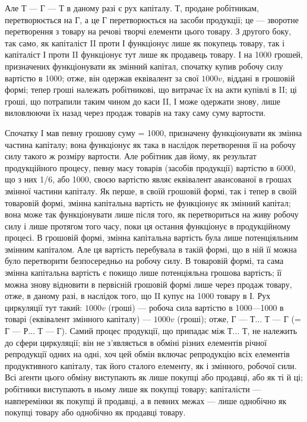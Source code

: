 Але Т — Г — Т в даному разі є рух капіталу. Т, продане робітникам,
перетворюється на Г, а це Г перетворюється на засоби продукції; це —
зворотне перетворення з товару на речові творчі елементи цього товару.
З другого боку, так само, як капіталіст II проти І функціонує лише як покупець
товару, так і капіталіст І проти II функціонує тут лише як продавець товару. І на 1000
грошей, призначених функціонувати як змінний капітал, спочатку купив робочу силу вартістю в 1000;
отже, він одержав еквівалент за свої $1000 v$, віддані в грошовій формі; тепер гроші належать
робітникові, що витрачає їх на акти купівлі в II; ці гроші, що потрапили таким чином до каси II, І
може одержати знову, лише виловлюючи їх назад через продаж товарів на таку саму суму вартости.

Спочатку І мав певну грошову суму = 1000, призначену функціонувати
як змінна частина капіталу; вона функціонує як така в наслідок перетворення її на робочу силу такого
ж розміру вартости. Але робітник дав йому, як результат продукційного процесу, певну масу товарів
(засобів продукції) вартістю в 6000, що з них 1/6, або 1000, своєю вартістю
являє еквівалент авансованої в грошах змінної частини капіталу. Як перше,
в своїй грошовій формі, так і тепер в своїй товаровій формі, змінна
капітальна вартість не функціонує як змінний капітал; вона може так
функціонувати лише після того, як перетвориться на живу робочу силу
і лише протягом того часу, поки ця остання функціонує в продукційному
процесі. В грошовій формі, змінна капітальна вартість була лише потенціяльним
змінним капіталом. Але ця вартість перебувала в такій формі,
що в ній її можна було перетворити безпосередньо на робочу силу.
В товаровій формі, та сама змінна капітальна вартість є покищо лише
потенціяльна грошова вартість; її можна знову відновити в первісній
грошовій формі лише через продаж товару, отже, в даному разі, в наслідок
того, що II купує на 1000 товару в І. Рух циркуляції тут такий:
$1000 v$ (гроші) — робоча сила вартістю в 1000—1000 в товарі (еквівалент
змінного капіталу) — $1000 v$ (гроші); отже, Г — Т... Т — Г (= Г — Р...
Т — Г). Самий процес продукції, що припадає між Т... Т, не належить до
сфери циркуляції; він не з’являється в обміні різних елементів річної
репродукції одних на одні, хоч цей обмін включає репродукцію всіх
елементів продуктивного капіталу, так його сталого елементу, як і змінного,
робочої сили. Всі аґенти цього обміну виступають як лише покупці
або продавці, або як ті й ці; робітники виступають в ньому лише як
покупці товару; капіталісти — навперемінки як покупці й продавці, а в
певних межах — лише однобічно як покупці товару або однобічно як продавці
товару.

